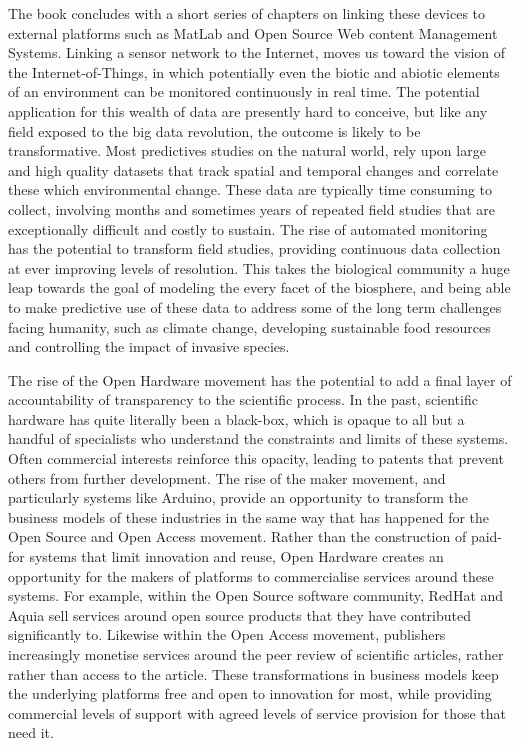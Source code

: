 \documentclass[
]{book}
\begin{document}
The book concludes with a short series of chapters on linking these devices to external platforms such as MatLab and Open Source Web content Management Systems. Linking a sensor network to the Internet, moves us toward the vision of the Internet-of-Things, in which potentially even the biotic and abiotic elements of an environment can be monitored continuously in real time. The potential application for this wealth of data are presently hard to conceive, but like any field exposed to the big data revolution, the outcome is likely to be transformative. Most predictives studies on the natural world, rely upon large and high quality datasets that track spatial and temporal changes and correlate these which environmental change. These data are typically time consuming to collect, involving months and sometimes years of repeated field studies that are exceptionally difficult and costly to sustain. The rise of automated monitoring has the potential to transform field studies, providing continuous data collection at ever improving levels of resolution. This takes the biological community a huge leap towards the goal of modeling the every facet of the biosphere, and being able to make predictive use of these data to address some of the long term challenges facing humanity, such as climate change, developing sustainable food resources and controlling the impact of invasive species.

The rise of the Open Hardware movement has the potential to add a final layer of accountability of transparency to the scientific process. In the past, scientific hardware has quite literally been a black-box, which is opaque to all but a handful of specialists who understand the constraints and limits of these systems. Often commercial interests reinforce this opacity, leading to patents that prevent others from further development. The rise of the maker movement, and particularly systems like Arduino, provide an opportunity to transform the business models of these industries in the same way that has happened for the Open Source and Open Access movement. Rather than the construction of paid-for systems that limit innovation and reuse, Open Hardware creates an opportunity for the makers of platforms to commercialise services around these systems. For example, within the Open Source software community, RedHat and Aquia sell services around open source products that they have contributed significantly to. Likewise within the Open Access movement, publishers increasingly monetise services around the peer review of scientific articles, rather rather than access to the article. These transformations in business models keep the underlying platforms free and open to innovation for most, while providing commercial levels of support with agreed levels of service provision for those that need it.
\end{document}
